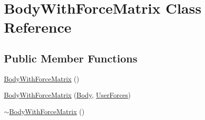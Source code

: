 \hypertarget{class_body_with_force_matrix}{\section{Body\-With\-Force\-Matrix Class Reference}
\label{class_body_with_force_matrix}
}
\subsection*{Public Member Functions}
\begin{DoxyCompactItemize}
\item 
\hyperlink{class_body_with_force_matrix_ac3c8391555c45e0a7eab476bf3488ae0}{Body\-With\-Force\-Matrix} ()
\item 
\hyperlink{class_body_with_force_matrix_a075b1ba0f74b27588f3e9affb7b9bb9e}{Body\-With\-Force\-Matrix} (\hyperlink{class_body}{Body}, \hyperlink{class_user_forces}{User\-Forces})
\item 
\hyperlink{class_body_with_force_matrix_a3eef8f497f99e49af7264a49a48a945d}{$\sim$\-Body\-With\-Force\-Matrix} ()
\end{DoxyCompactItemize}
